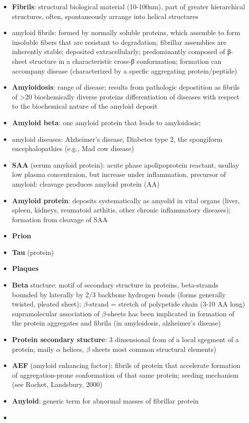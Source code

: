 \documentclass[fleqn]{article}\usepackage{caption}
\begin{document}
\begin{itemize}
\item \textbf{Fibrils}: structural biological material (10-100nm), part of greater hierarchical structures, often, spontaneously arrange into helical structures

\item amyloid fibrils: formed by normally soluble proteins, which assemble to form insoluble fibers that are resistant to degradation; fibrillar assemblies are inherently stable; deposited extracellularly; predominantly composed of β-sheet structure in a characteristic cross-β conformation; formation can accompany disease (characterized by a specfic aggregating protein/peptide) %

\item \textbf{Amyloidosis}: range of disease; results from pathologic depostition as fibrils of >20 biochemically diverse proteins %
differentiation of diseases with respect to the biochemical nature of the amyloid deposit %

\item \textbf{Amyloid beta}: one amyloid protein that leads to amyloidosis; 

\item amyloid diseases: Alzheimer's disease, Diabetes type 2, the spongiform encephalopathies (e.g., Mad cow disease) %
\item \textbf{SAA} (serum amyloid protein): acute phase apolipoprotein reactant, usullay low plasma concentraion, but increase under inflammation, precursor of amyloid: cleavage produces amyloid protein (AA)
\item \textbf{Amyloid protein}: deposits systematically as amyolid in vital organs (liver, spleen, kidneys, reumatoid arthitis, other chronic inflammatory diseases); formation from  cleavage of SAA
\item \textbf{Prion}
\item \textbf{Tau} (protein)
\item \textbf{Plaques}
\item \textbf{Beta} stucture: motif of secondary structure in proteins, beta-strands bounded by laterally by 2/3 backbone hydrogen bonds (forms generally twisted, pleated sheet); $\beta$-strand = stretch of polypetide chain (3-10 AA long) 
supramolecular association of $\beta$-sheets has been implicated in formation of the protein aggregates and fibrila (in amyloidosis, alzheimer's disease)

\item \textbf{Protein secondary stucture}: 3 dimensional from of a local sgegment of a protein; maily $\alpha$ helices, $\beta$ sheets most common structural elements) 

\item \textbf{AEF} (amyloid enhancing factor): fibrils of protein that accelerate formation of aggregation-prone conformation of that same protein; seeding mechanism (see Rochet, Landsbury, 2000)

\item \textbf{Anyloid}: generic term for abnormal masses of fibrillar protein %
\item 
\end{itemize}
\end{document}

